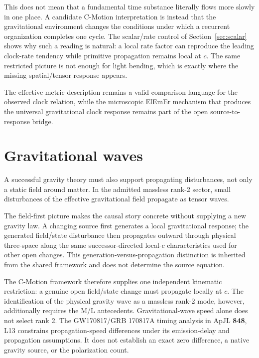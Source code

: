 \documentclass[11pt]{article}
\newcommand{\cmotion}{\mbox{C-Motion}}
\newcommand{\ElEmEr}{\mbox{ElEmEr}}
\theoremstyle{plain}
\theoremstyle{remark}
\begin{document}
This does not mean that a fundamental time substance literally flows more slowly in one
place.  A candidate \cmotion{} interpretation is instead that the gravitational
environment changes the conditions under which a recurrent organization completes one
cycle.  The scalar/rate control of Section~\ref{sec:scalar} shows why such a reading is
natural: a local rate factor can reproduce the leading clock-rate tendency while
primitive propagation remains local at $c$.  The same restricted picture is not enough
for light bending, which is exactly where the missing spatial/tensor response appears.

The effective metric description remains a valid comparison language for the observed
clock relation, while the microscopic \ElEmEr{} mechanism that produces the universal
gravitational clock response remains part of the open source-to-response bridge.

\section{Gravitational waves}
\label{sec:gw}

A successful gravity theory must also support propagating disturbances, not only a static
field around matter.  In the admitted massless rank-2 sector, small disturbances of the
effective gravitational field propagate as tensor waves.

The field-first picture makes the causal story concrete without supplying a new gravity
law.  A changing source first generates a local gravitational response; the generated
field/state disturbance then propagates outward through physical three-space along the
same successor-directed local-$c$ characteristics used for other open changes.  This
generation-versus-propagation distinction is inherited from the shared framework and does
not determine the source equation.

The \cmotion{} framework therefore supplies one independent kinematic restriction: a
genuine open field/state change must propagate locally at $c$.  The identification of the
physical gravity wave as a massless rank-2 mode, however, additionally requires the M/L
antecedents.  Gravitational-wave speed alone does not select rank 2.
The GW170817/GRB 170817A timing analysis in ApJL \textbf{848}, L13
\cite{Abbott2017GW170817Gamma} constrains propagation-speed differences
under its emission-delay and propagation assumptions.  It does not establish
an exact zero difference, a native gravity source, or the polarization count.
\end{document}
